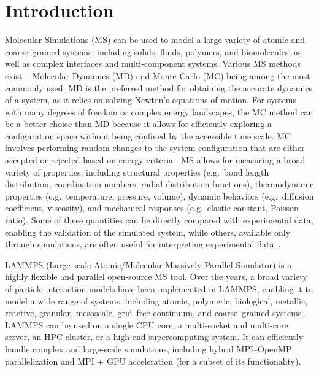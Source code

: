 \documentclass[9pt,tutorial]{livecoms}
\begin{document}
\section{Introduction}

Molecular Simulations (MS) can be used to model a large variety of
atomic and coarse--grained systems, including solids, fluids, polymers, and
biomolecules, as well as complex interfaces and multi-component systems.
Various MS methods exist -- Molecular Dynamics (MD) and Monte Carlo (MC)
being among the most commonly used.  MD is the preferred method for
obtaining the accurate dynamics of a system, as it relies on solving
Newton's equations of motion.  For systems with many degrees of freedom
or complex energy landscapes, the MC method can be a better choice than
MD because it allows for efficiently exploring a configuration space
without being confined by the accessible time scale.  MC involves
performing random changes to the system configuration that are either
accepted or rejected based on energy criteria
\cite{frenkel2023understanding, allen2017computer}.  MS allows for
measuring a broad variety of properties, including structural properties
(e.g.~bond length distribution, coordination numbers, radial
distribution functions), thermodynamic properties (e.g.~temperature,
pressure, volume), dynamic behaviors (e.g.~diffusion coefficient,
viscosity), and mechanical responses (e.g.~elastic constant, Poisson
ratio).  Some of these quantities can be directly compared with
experimental data, enabling the validation of the simulated system,
while others, available only through simulations, are often useful for
interpreting experimental data~\cite{van2008molecular}.

LAMMPS (Large-scale Atomic/Molecular Massively Parallel Simulator)
\cite{lammps_home} is a highly flexible and parallel open-source MS
tool.  Over the years, a broad variety of particle interaction models
have been implemented in LAMMPS, enabling it to model a wide range of
systems, including atomic, polymeric, biological, metallic, reactive, granular,
mesoscale, grid--free continuum, and coarse--grained systems
\cite{thompson2022lammps}.  LAMMPS can be used on a single CPU core, a
multi-socket and multi-core server, an HPC cluster, or a high-end
supercomputing system.  It can efficiently handle complex and large-scale
simulations, including hybrid MPI--OpenMP parallelization
and MPI + GPU acceleration (for a subset of its functionality).
\end{document}
